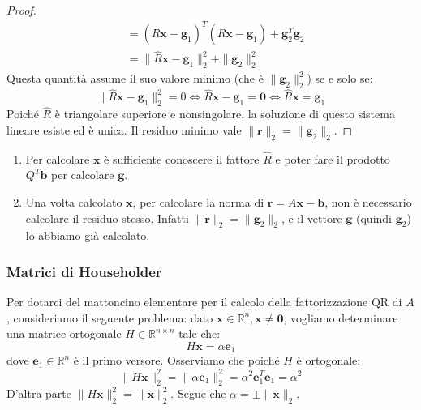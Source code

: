 \begin{proof}
\begin{align*}
        &= (\hat{R}\mathbf{x} - \mathbf{g}_1)^T (\hat{R}\mathbf{x} - \mathbf{g}_1) + \mathbf{g}_2^T \mathbf{g}_2 \\
        &= \| \hat{R}\mathbf{x} - \mathbf{g}_1 \|_2^2 + \| \mathbf{g}_2 \|_2^2
    \end{align*}
    Questa quantità assume il suo valore minimo (che è $\| \mathbf{g}_2 \|_2^2$) se e solo se:
    $$ \| \hat{R}\mathbf{x} - \mathbf{g}_1 \|_2^2 = 0 \iff \hat{R}\mathbf{x} - \mathbf{g}_1 = \mathbf{0} \iff \hat{R}\mathbf{x} = \mathbf{g}_1 $$
    Poiché $\hat{R}$ è triangolare superiore e nonsingolare, la soluzione di questo sistema lineare esiste ed è unica.
    Il residuo minimo vale $\| \mathbf{r} \|_2 = \| \mathbf{g}_2 \|_2$.
    \end{proof}

\begin{osservazione}
\begin{enumerate}
    \item Per calcolare $\mathbf{x}$ è sufficiente conoscere il fattore $\hat{R}$ e poter fare il prodotto $Q^T \mathbf{b}$ per calcolare $\mathbf{g}$.
    \item Una volta calcolato $\mathbf{x}$, per calcolare la norma di $\mathbf{r} = A\mathbf{x} - \mathbf{b}$, non è necessario calcolare il residuo stesso. Infatti $\| \mathbf{r} \|_2 = \| \mathbf{g}_2 \|_2$, e il vettore $\mathbf{g}$ (quindi $\mathbf{g}_2$) lo abbiamo già calcolato.
\end{enumerate}
\end{osservazione}

\subsubsection{Matrici di Householder}
Per dotarci del mattoncino elementare per il calcolo della fattorizzazione QR di $A$, consideriamo il seguente problema: dato $\mathbf{x} \in \mathbb{R}^n, \mathbf{x} \neq \mathbf{0}$, vogliamo determinare una matrice ortogonale $H \in \mathbb{R}^{n \times n}$ tale che:
\begin{equation} \label{eq:householder_prob}
    H \mathbf{x} = \alpha \mathbf{e}_1
\end{equation}
dove $\mathbf{e}_1 \in \mathbb{R}^n$ è il primo versore.
Osserviamo che poiché $H$ è ortogonale:
$$ \| H \mathbf{x} \|_2^2 = \| \alpha \mathbf{e}_1 \|_2^2 = \alpha^2 \mathbf{e}_1^T \mathbf{e}_1 = \alpha^2 $$
D'altra parte $\| H \mathbf{x} \|_2^2 = \| \mathbf{x} \|_2^2$. Segue che $\alpha = \pm \| \mathbf{x} \|_2$.

